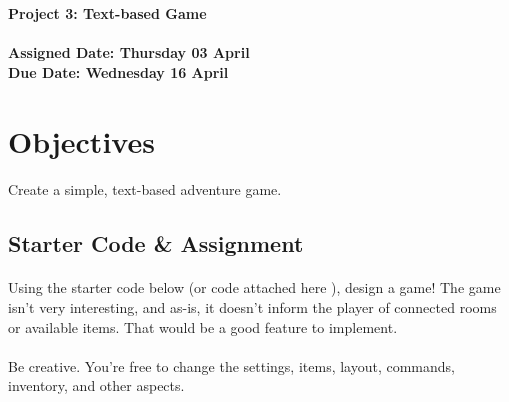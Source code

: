 \documentclass[letter,10pt]{article}
\begin{document}
    
    \huge
    \textbf{Project 3: Text-based Game}
    \normalsize
    \\ ~~ \\
    \textbf{Assigned Date: Thursday 03 April} \\
    \textbf{Due Date: Wednesday 16 April}
    
    \section*{Objectives}
    \paragraph{}Create a simple, text-based adventure game.
    
    \subsection*{Starter Code \& Assignment}
    \paragraph{}Using the starter code below (or code attached here ), design a game! The game isn't very interesting, and as-is, it doesn't inform the player of connected rooms or available items. That would be a good feature to implement.
    
    \paragraph{}Be creative. You're free to change the settings, items, layout, commands, inventory, and other aspects.
    
\end{document}
